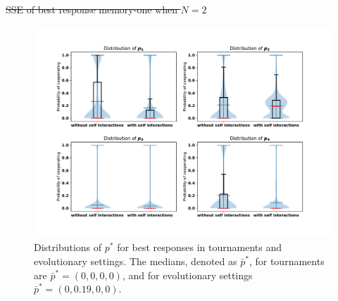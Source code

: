 \documentclass[10pt]{article}
\providecommand{\DIFdeltex}[1]{{\protect\color{red}\sout{#1}}}                      %
\providecommand{\DIFdelbegin}{} %
\providecommand{\DIFdelend}{} %
\providecommand{\DIFdelFL}[1]{\DIFdel{#1}} %
\providecommand{\DIFaddbeginFL}{} %
\providecommand{\DIFaddendFL}{} %
\providecommand{\DIFdelbeginFL}{} %
\providecommand{\DIFdelendFL}{} %
\providecommand{\DIFdel}[1]{\texorpdfstring{\DIFdeltex{#1}}{}} %
\newcommand{\DIFscaledelfig}{0.5}
\newlength{\DIFdelgraphicswidth} %
\newlength{\DIFdelgraphicsheight} %
\newcommand{\DIFaddincludegraphics}[2][]{{\color{blue}\fbox{\DIFOincludegraphics[#1]{#2}}}} %
\newcommand{\DIFdelincludegraphics}[2][]{%
\sbox{\DIFdelgraphicsbox}{\DIFOincludegraphics[#1]{#2}}%
\settoboxwidth{\DIFdelgraphicswidth}{\DIFdelgraphicsbox} %
\settoboxtotalheight{\DIFdelgraphicsheight}{\DIFdelgraphicsbox} %
\scalebox{\DIFscaledelfig}{%
\parbox[b]{\DIFdelgraphicswidth}{\usebox{\DIFdelgraphicsbox}\\[-\baselineskip] \rule{\DIFdelgraphicswidth}{0em}}\llap{\resizebox{\DIFdelgraphicswidth}{\DIFdelgraphicsheight}{%
\setlength{\unitlength}{\DIFdelgraphicswidth}%
\begin{picture}(1,1)%
\thicklines\linethickness{2pt} %
{\color[rgb]{1,0,0}\put(0,0){\framebox(1,1){}}}%
{\color[rgb]{1,0,0}\put(0,0){\line( 1,1){1}}}%
{\color[rgb]{1,0,0}\put(0,1){\line(1,-1){1}}}%
\end{picture}%
}\hspace*{3pt}}} %
} %
\DeclareRobustCommand{\DIFdelbegin}{\DIFOdelbegin \let\includegraphics\DIFdelincludegraphics} %
\DeclareRobustCommand{\DIFdelend}{\DIFOaddend \let\includegraphics\DIFOincludegraphics} %
\DeclareRobustCommand{\DIFaddbeginFL}{\DIFOaddbeginFL \let\includegraphics\DIFaddincludegraphics} %
\DeclareRobustCommand{\DIFaddendFL}{\DIFOaddendFL \let\includegraphics\DIFOincludegraphics} %
\DeclareRobustCommand{\DIFdelbeginFL}{\DIFOdelbeginFL \let\includegraphics\DIFdelincludegraphics} %
\DeclareRobustCommand{\DIFdelendFL}{\DIFOaddendFL \let\includegraphics\DIFOincludegraphics} %
\begin{document}
\DIFdelbegin %
{%
\DIFdelFL{SSE of best response memory-one when \(N=2\)}}%

\DIFdelend \begin{figure}[!htbp]
    \centering
    \DIFdelbeginFL %
\DIFdelendFL \DIFaddbeginFL \includegraphics[width=.9\textwidth]{img/behaviour_violin_plots.pdf}
    \DIFaddendFL \caption{Distributions of \(p^*\) for best responses in tournaments and
    evolutionary settings. The medians, denoted as \(\bar{p}^*\), for tournaments
    are \(\bar{p}^* = (0, 0, 0, 0)\), and for evolutionary settings
    \(\bar{p}^* = (0, 0.19, 0, 0)\).}
    \label{fig:behaviour_violin_plots}
\end{figure}
\end{document}
